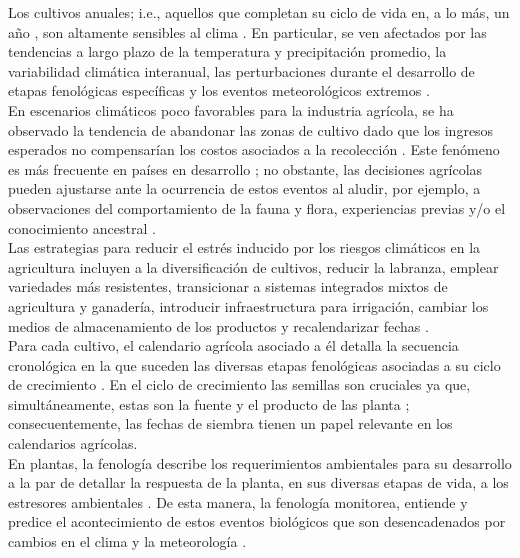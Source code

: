 Los cultivos anuales; i.e., aquellos que completan su ciclo de vida en, a lo más, un año \cite{SIMPSON_2010}, son altamente sensibles al clima \cite{FAO_2017}. En particular, se ven afectados por las tendencias a largo plazo de la temperatura y precipitación promedio, la variabilidad climática interanual, las perturbaciones durante el desarrollo de etapas fenológicas específicas y los eventos meteorológicos extremos   \cite{IPCC_2012}.\\


En escenarios climáticos poco favorables para la industria agrícola, se ha observado la tendencia de abandonar las zonas de cultivo dado que los ingresos esperados no compensarían los costos asociados a la recolección \cite{Cui_2020}. Este fenómeno es más frecuente en países en desarrollo \cite{Chekenya_2023}; no obstante, las decisiones agrícolas pueden ajustarse ante la ocurrencia de estos eventos \cite{Cui_2020} al aludir, por ejemplo, a observaciones del comportamiento de la fauna y flora, experiencias previas y/o el  conocimiento ancestral  \cite{MUGINGENGA_2021}.\\


Las estrategias para reducir el estrés inducido por los riesgos climáticos  en la agricultura incluyen a la diversificación de cultivos, reducir la labranza, emplear variedades más resistentes, transicionar a sistemas integrados mixtos de agricultura y ganadería, introducir infraestructura para irrigación, cambiar los medios de almacenamiento de los productos y recalendarizar fechas \cite{YASEEN_2025,Cui_2020, Chekenya_2023}.\\

Para cada cultivo, el calendario agrícola asociado a él detalla la secuencia cronológica en la que suceden las diversas etapas fenológicas asociadas a su ciclo de crecimiento \cite{Patel_2014}. En el ciclo de crecimiento las semillas son cruciales ya que, simultáneamente, estas son la fuente y el producto de las planta \cite{Hickling_1995}; consecuentemente, las fechas de siembra tienen un papel relevante en los calendarios agrícolas.\\

En plantas, la fenología describe los requerimientos ambientales para su desarrollo a la par de detallar la respuesta de la planta, en sus diversas etapas de vida, a los estresores ambientales \cite{DONOHUE_2015}. De esta manera, la fenología monitorea, entiende y predice el acontecimiento de estos eventos biológicos que son desencadenados por cambios en el clima y la meteorología \cite{ KELLER_2020, LIANG_2019,MORELLATO_2016,RECKNAGEL_2023,RICHARDSON_2023}.\\\


